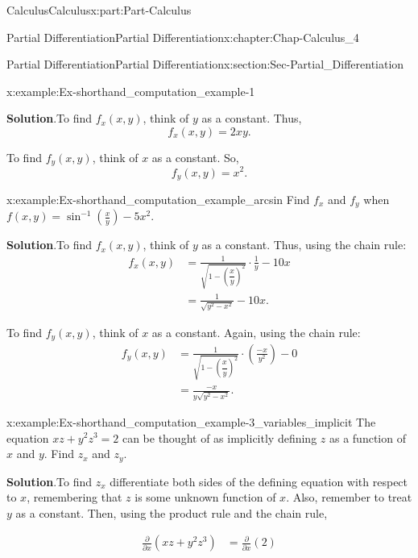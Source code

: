\documentclass[oneside,10pt,]{book}
\newcommand{\blocktitlefont}{\relax}
\numberwithin{equation}{section}
\newcommand{\amp}{&}
\begin{document}
\begin{partptx}{Calculus}{}{Calculus}{}{}{x:part:Part-Calculus}
\begin{chapterptx}{Partial Differentiation}{}{Partial Differentiation}{}{}{x:chapter:Chap-Calculus_4}
\begin{sectionptx}{Partial Differentiation}{}{Partial Differentiation}{}{}{x:section:Sec-Partial_Differentiation}
\begin{example}{}{x:example:Ex-shorthand_computation_example-1}
\par\smallskip%
\noindent\textbf{\blocktitlefont Solution}.\hypertarget{g:solution:id546143}{}\quad{}To find \(f_x (x,y)\), think of \(y\) as a constant. Thus,%
\begin{equation*}
f_x(x,y) = 2xy\text{.}
\end{equation*}
%
\par
To find \(f_y (x,y)\), think of \(x\) as a constant. So,%
\begin{equation*}
f_y(x,y) = x^2\text{.}
\end{equation*}
%
\end{example}
\begin{example}{}{x:example:Ex-shorthand_computation_example_arcsin}%
Find \(f_x\) and \(f_y\) when \(f(x,y) = \sin^{-1}\left(\frac{x}{y}\right) - 5x^2\).%
\par\smallskip%
\noindent\textbf{\blocktitlefont Solution}.\hypertarget{g:solution:id546206}{}\quad{}To find \(f_x (x,y)\), think of \(y\) as a constant. Thus, using the chain rule:%
\begin{align*}
f_x(x,y) \amp = \frac{1}{\sqrt{1 - \left(\dfrac{x}{y}\right)^2 }} \cdot \frac{1}{y} - 10x\\
\amp = \frac{1}{\sqrt{y^2 - x^2}} - 10x\text{.}
\end{align*}
%
\par
To find \(f_y (x,y)\), think of \(x\) as a constant. Again, using the chain rule:%
\begin{align*}
f_y(x,y) \amp = \frac{1}{\sqrt{1 - \left(\dfrac{x}{y}\right)^2 }} \cdot \left( \frac{-x}{y^2} \right) - 0\\
\amp = \frac{-x}{y\sqrt{y^2-x^2}}.
\end{align*}
%
\end{example}
\begin{example}{}{x:example:Ex-shorthand_computation_example-3_variables_implicit}%
The equation \(xz + y^2z^3 = 2\) can be thought of as implicitly defining \(z\) as a function of \(x\) and \(y\). Find \(z_x\) and \(z_y\).%
\par\smallskip%
\noindent\textbf{\blocktitlefont Solution}.\hypertarget{g:solution:id546290}{}\quad{}To find \(z_x\) differentiate both sides of the defining equation with respect to \(x\), remembering that \(z\) is some unknown function of \(x\). Also, remember to treat \(y\) as a constant. Then, using the product rule and the chain rule,%
\par
%
\begin{align*}
\frac{\partial}{\partial x} \left(xz + y^2z^3 \right) \amp = \frac{\partial}{\partial x} (2)\\

\end{align*}
\end{example}
\end{sectionptx}
\end{chapterptx}
\end{partptx}
\end{document}

